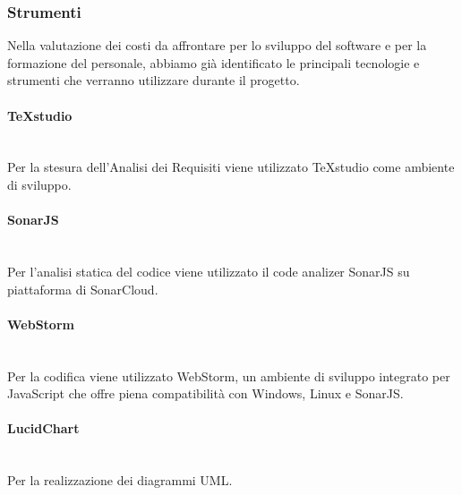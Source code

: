 \subsubsection{Strumenti}
Nella valutazione dei costi da affrontare per lo sviluppo del software e per la formazione del personale, abbiamo già identificato le principali tecnologie e strumenti che verranno utilizzare durante il progetto.
\paragraph{TeXstudio}\mbox{}\\ [1mm]
Per la stesura dell'Analisi dei Requisiti viene utilizzato TeXstudio come ambiente di sviluppo.
\paragraph{SonarJS}\mbox{}\\ [1mm]
Per l'analisi statica del codice viene utilizzato il code analizer SonarJS su piattaforma di SonarCloud.
\paragraph{WebStorm}\mbox{}\\ [1mm]
Per la codifica viene utilizzato WebStorm, un ambiente di sviluppo integrato per JavaScript che offre piena compatibilità con Windows, Linux e SonarJS.
\paragraph{LucidChart}\mbox{}\\ [1mm]
Per la realizzazione dei diagrammi UML.	